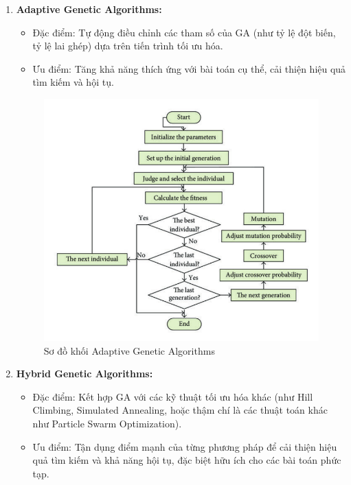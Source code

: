 \documentclass[14pt]{article}
\begin{document}
\begin{enumerate}
		\newpage
		\item \textbf{Adaptive Genetic Algorithms:}
		\begin{itemize}
			\item Đặc điểm: Tự động điều chỉnh các tham số của GA (như tỷ lệ đột biến, tỷ lệ lai ghép) dựa trên tiến trình tối ưu hóa.
			\item Ưu điểm: Tăng khả năng thích ứng với bài toán cụ thể, cải thiện hiệu quả tìm kiếm và hội tụ.
		\end{itemize}
		\begin{figure}[htbp]
			\centering
			\includegraphics[width=\textwidth]{./Image/Sơ đồ khối Adaptive Genetic Algorithms.png}
			\caption{Sơ đồ khối Adaptive Genetic Algorithms}
			\label{fig:mylabel}
		\end{figure}
	
		\newpage
		\item \textbf{Hybrid Genetic Algorithms:}
		\begin{itemize}
			\item Đặc điểm: Kết hợp GA với các kỹ thuật tối ưu hóa khác (như Hill Climbing, Simulated Annealing, hoặc thậm chí là các thuật toán khác như Particle Swarm Optimization).
			\item Ưu điểm: Tận dụng điểm mạnh của từng phương pháp để cải thiện hiệu quả tìm kiếm và khả năng hội tụ, đặc biệt hữu ích cho các bài toán phức tạp.
		\end{itemize}
	

\end{enumerate}
\end{document}
